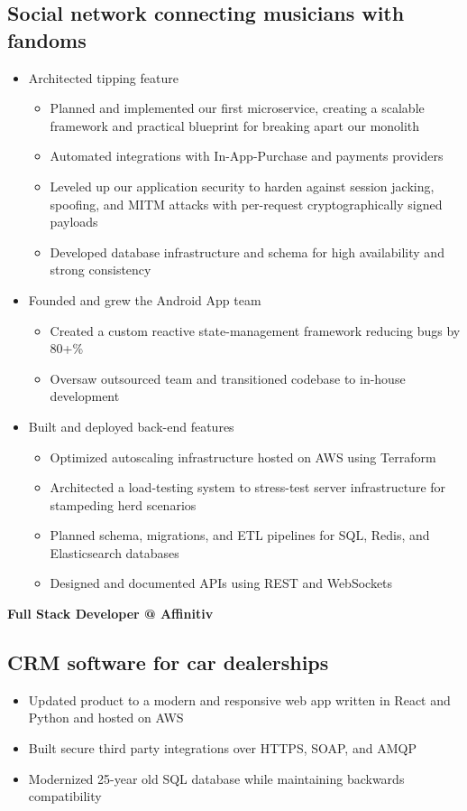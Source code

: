 \documentclass[11pt]{article}
\makeatletter
\newcommand{\experienceheading}[4]{%
    \noindent\textbf{\large\overlock #1 @ #2}
    \hfill
    \settowidth{\dimen0}{ 0000\textendash0000}
    \makebox[\dimen0][l]{ \daterange{#3}{#4}
    }
}
\newcommand{\daterange}[2]{%
  \ifstrempty{#2}{#1}{#1\textendash#2}%
}
\makeatother
\begin{document}
\begin{paracol}{2}
\begin{rightcolumn}
\subsection{Social network connecting musicians with fandoms}
\begin{itemize}
    \item Architected tipping feature
        \begin{itemize} 
            \item Planned and implemented our first microservice, creating a scalable framework and practical blueprint for breaking apart our monolith
            \item Automated integrations with In-App-Purchase and payments providers
            \item Leveled up our application security to harden against session jacking, spoofing, and MITM attacks with per-request cryptographically signed payloads
            \item Developed database infrastructure and schema for high availability and strong consistency
          \end{itemize}
    \item Founded and grew the Android App team
    \begin{itemize} 
        \item Created a custom reactive state-management framework reducing bugs by 80+\%
        \item Oversaw outsourced team and transitioned codebase to in-house development
        \end{itemize}
    \item Built and deployed back-end features
    \begin{itemize}
        \item Optimized autoscaling infrastructure hosted on AWS using Terraform
        \item Architected a load-testing system to stress-test server infrastructure for stampeding herd scenarios
        \item Planned schema, migrations, and ETL pipelines for SQL, Redis, and Elasticsearch databases
        \item Designed and documented APIs using REST and WebSockets
    \end{itemize}
\end{itemize}

\experienceheading{Full Stack Developer}{Affinitiv}{2016}{2017}
\subsection{CRM software for car dealerships}
\begin{itemize}
    \item Updated product to a modern and responsive web app written in React and Python and hosted on AWS
    \item Built secure third party integrations over HTTPS, SOAP, and AMQP
    \item Modernized 25-year old SQL database while maintaining backwards compatibility
\end{itemize}
\end{rightcolumn}
\end{paracol}
\end{document}
